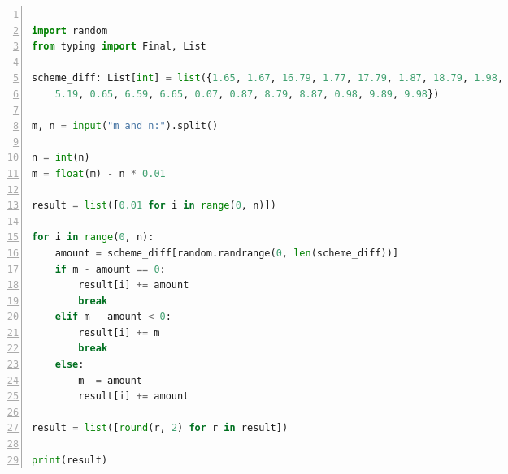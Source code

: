 \documentclass[a4paper,twoside]{article}
\begin{document}
\begin{spacing}{1.2}
\begin{lstlisting}[language=Python,numbers=left,style=PythonStyle,caption=红包发放,label={code:redpacket}]
	
import random
from typing import Final, List

scheme_diff: List[int] = list({1.65, 1.67, 16.79, 1.77, 17.79, 1.87, 18.79, 1.98,
	5.19, 0.65, 6.59, 6.65, 0.07, 0.87, 8.79, 8.87, 0.98, 9.89, 9.98})

m, n = input("m and n:").split()

n = int(n)
m = float(m) - n * 0.01

result = list([0.01 for i in range(0, n)])

for i in range(0, n):
	amount = scheme_diff[random.randrange(0, len(scheme_diff))]
	if m - amount == 0:
		result[i] += amount
		break
	elif m - amount < 0:
		result[i] += m
		break
	else:
		m -= amount
		result[i] += amount

result = list([round(r, 2) for r in result])

print(result)

\end{lstlisting}

\end{spacing}
\end{document}
